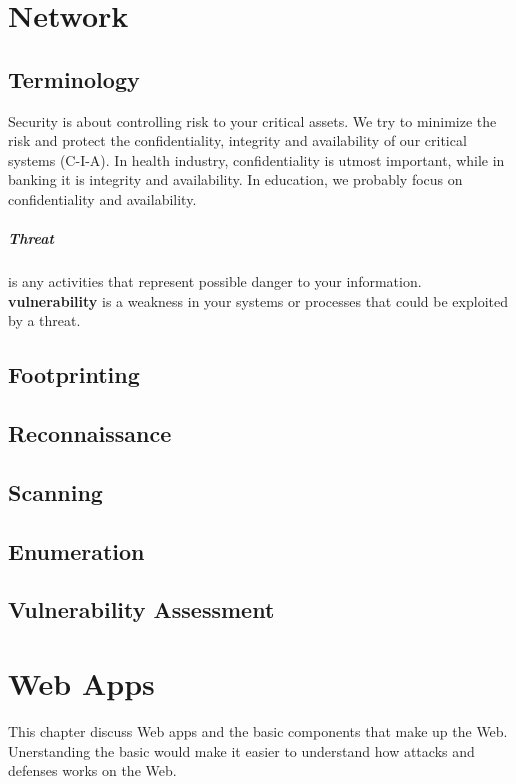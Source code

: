 \documentclass[7x9]{times}
\begin{document}
\chapter{Network}

\section{Terminology}

Security is about controlling risk to your critical assets.
We try to minimize the risk and protect the confidentiality,
integrity and availability of our critical systems (C-I-A).
In health industry, confidentiality is utmost important,
while in banking it is integrity and availability. In
education, we probably focus on confidentiality and
availability.

\paragraph{Threat} is any activities that represent possible
danger to your information. \textbf{vulnerability} is a 
weakness in your systems or processes that could be 
exploited by a threat. 



\section{Footprinting}

\section{Reconnaissance}
\section{Scanning}
\section{Enumeration}
\section{Vulnerability Assessment}



\chapter{Web Apps}

This chapter discuss Web apps and the basic components that make up the Web.
Unerstanding the basic would make it easier to understand how attacks and defenses
works on the Web.
\end{document}
